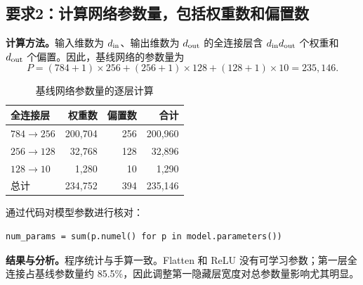 \documentclass[UTF8,11pt,a4paper,fontset=fandol]{ctexart}
\newcommand{\question}[1]{\Needspace{14\baselineskip}\subsection{#1}}
\begin{document}
\question{要求2：计算网络参数量，包括权重数和偏置数}
\textbf{计算方法。}输入维数为 $d_{\rm in}$、输出维数为 $d_{\rm out}$ 的全连接层含 $d_{\rm in}d_{\rm out}$ 个权重和 $d_{\rm out}$ 个偏置。因此，基线网络的参数量为
\begin{equation}
P=(784+1)\times256+(256+1)\times128+(128+1)\times10=235,146.
\end{equation}
\begin{table}[H]\centering\small
\caption{基线网络参数量的逐层计算}
\begin{tabular}{lrrr}\toprule
全连接层 & 权重数 & 偏置数 & 合计 \\\midrule
$784\to256$ & 200,704 & 256 & 200,960 \\
$256\to128$ & 32,768 & 128 & 32,896 \\
$128\to10$ & 1,280 & 10 & 1,290 \\\midrule
总计 & 234,752 & 394 & 235,146 \\
\bottomrule\end{tabular}
\end{table}
通过代码对模型参数进行核对：
\par\noindent\begin{minipage}{\linewidth}
\begin{lstlisting}
num_params = sum(p.numel() for p in model.parameters())
\end{lstlisting}
\end{minipage}\par
\textbf{结果与分析。}程序统计与手算一致。Flatten 和 ReLU 没有可学习参数；第一层全连接占基线参数量约 85.5\%，因此调整第一隐藏层宽度对总参数量影响尤其明显。
\end{document}
